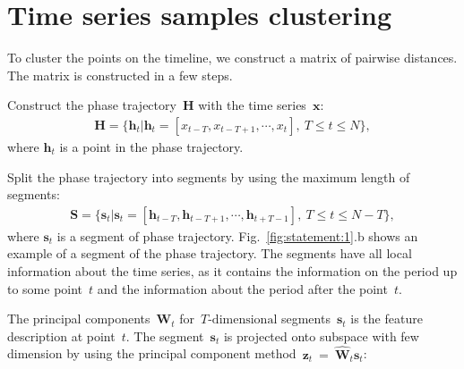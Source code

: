 \documentclass[12pt, twoside]{article}
\numberwithin{equation}{section}
\begin{document}
\section{Time series samples clustering}
To cluster the points on the timeline, we construct a matrix of pairwise distances. The matrix is constructed in a few steps.

Construct the phase trajectory~$\mathbf{H}$ with the time series~$\textbf{x}$:
\begin{equation}
\label{eq:cl:1}
\begin{aligned}
\mathbf{H} = \{\textbf{h}_t| \textbf{h}_t = [x_{t-T}, x_{t-T+1}, \cdots, x_{t}],~T\leq t\leq N\},
\end{aligned}
\end{equation}
where $\textbf{h}_t$ is a point in the phase trajectory.

Split the phase trajectory into segments by using the maximum length of segments:
\begin{equation}
\label{eq:cl:2}
\begin{aligned}
\mathbf{S} = \{\textbf{s}_t| \textbf{s}_t = [\textbf{h}_{t-T}, \textbf{h}_{t-T+1}, \cdots, \textbf{h}_{t+T-1}],~T\leq t\leq N-T\},
\end{aligned}
\end{equation}
where $\textbf{s}_t$ is a segment of phase trajectory. 
Fig.~\ref{fig:statement:1}.b shows an example of a segment of the phase trajectory. 
The segments have all local information about the time series, as it contains the information on the period up to some point~$t$ and the information about the period after the point~$t$.


The principal components~$\textbf{W}_t$ for~$T\text{-dimensional}$ segments~$\textbf{s}_t$ is the feature description at point~$t$. The segment~$\textbf{s}_t $ is projected onto subspace with few dimension by using the principal component method~$\textbf{z}_t~=~\hat{\textbf{W}}_t\textbf{s}_t$:
\end{document}
